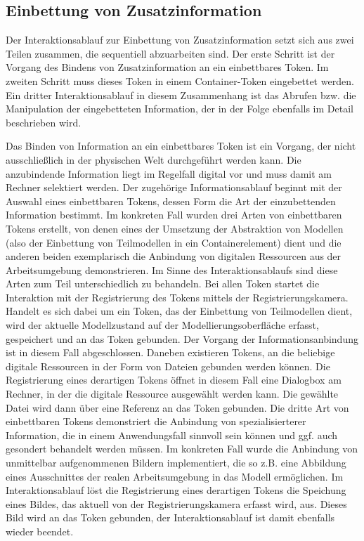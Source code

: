 
\subsection{Einbettung von Zusatzinformation} %
\label{sub:einbettung_von_zusatzinformation}

Der Interaktionsablauf zur Einbettung von Zusatzinformation setzt sich aus zwei Teilen zusammen, die sequentiell abzuarbeiten sind. Der erste Schritt ist der Vorgang des Bindens von Zusatzinformation an ein einbettbares Token. Im zweiten Schritt muss dieses Token in einem Container-Token eingebettet werden. Ein dritter Interaktionsablauf in diesem Zusammenhang ist das Abrufen  bzw. die Manipulation der eingebetteten Information, der in der Folge ebenfalls im Detail beschrieben wird.

Das Binden von Information an ein einbettbares Token ist ein Vorgang, der nicht ausschließlich in der physischen Welt durchgeführt werden kann. Die anzubindende Information liegt im Regelfall digital vor und muss damit am Rechner selektiert werden. Der zugehörige Informationsablauf beginnt mit der Auswahl eines einbettbaren Tokens, dessen Form die Art der einzubettenden Information bestimmt. Im konkreten Fall wurden drei Arten von einbettbaren Tokens erstellt, von denen eines der Umsetzung der Abstraktion von Modellen (also der Einbettung von Teilmodellen in ein Containerelement) dient und die anderen beiden exemplarisch die Anbindung von digitalen Ressourcen aus der Arbeitsumgebung demonstrieren. Im Sinne des Interaktionsablaufs sind diese Arten zum Teil unterschiedlich zu behandeln. Bei allen Token startet die Interaktion mit der Registrierung des Tokens mittels der Registrierungskamera. Handelt es sich dabei um ein Token, das der Einbettung von Teilmodellen dient, wird der aktuelle Modellzustand auf der Modellierungsoberfläche erfasst, gespeichert und an das Token gebunden. Der Vorgang der Informationsanbindung ist in diesem Fall abgeschlossen. Daneben existieren Tokens, an die beliebige digitale Ressourcen in der Form von Dateien gebunden werden können. Die Registrierung eines derartigen Tokens öffnet in diesem Fall eine Dialogbox am Rechner, in der die digitale Ressource ausgewählt werden kann. Die gewählte Datei wird dann über eine Referenz an das Token gebunden. Die dritte Art von einbettbaren Tokens demonstriert die Anbindung von spezialisierterer Information, die in einem Anwendungsfall sinnvoll sein können und ggf. auch gesondert behandelt werden müssen. Im konkreten Fall wurde die Anbindung von unmittelbar aufgenommenen Bildern implementiert, die so z.B. eine Abbildung eines Ausschnittes der realen Arbeitsumgebung in das Modell ermöglichen. Im Interaktionsablauf löst die Registrierung eines derartigen Tokens die Speichung eines Bildes, das aktuell von der Registrierungskamera erfasst wird, aus. Dieses Bild wird an das Token gebunden, der Interaktionsablauf ist damit ebenfalls wieder beendet.

